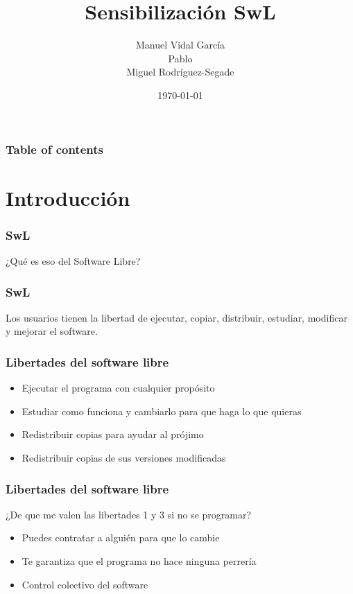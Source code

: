 \documentclass{beamer}
\title{Sensibilización SwL}
\author{Manuel Vidal García\\ Pablo \\ Miguel Rodríguez-Segade}
\date{\today}
\begin{document}
\begin{frame}
    \titlepage
\end{frame}

\begin{frame} \frametitle{Table of contents}
    \tableofcontents
\end{frame}


\section{Introducción}

\begin{frame}\frametitle{SwL}
    ¿Qué es eso del Software Libre?
\end{frame}


\begin{frame}\frametitle{SwL}

    Los usuarios tienen la libertad de ejecutar, copiar, distribuir, estudiar,
    modificar y mejorar el software.


\end{frame}

\begin{frame}\frametitle{Libertades del software libre}

    \begin{itemize}
        \item Ejecutar el programa con cualquier propósito
        \item Estudiar como funciona y cambiarlo para que haga lo que quieras
        \item Redistribuir copias para ayudar al prójimo
        \item Redistribuir copias de sus versiones modificadas
    \end{itemize}

\end{frame}

\begin{frame}\frametitle{Libertades del software libre}

    \begin{block}{¿De que me valen las libertades 1 y 3 si no se programar?}
        \begin{itemize}
            \item Puedes contratar a alguién para que lo cambie
            \item Te garantiza que el programa no hace ninguna perrería
            \item Control colectivo del software
        \end{itemize}
    \end{block}
\end{frame}
\end{document}

